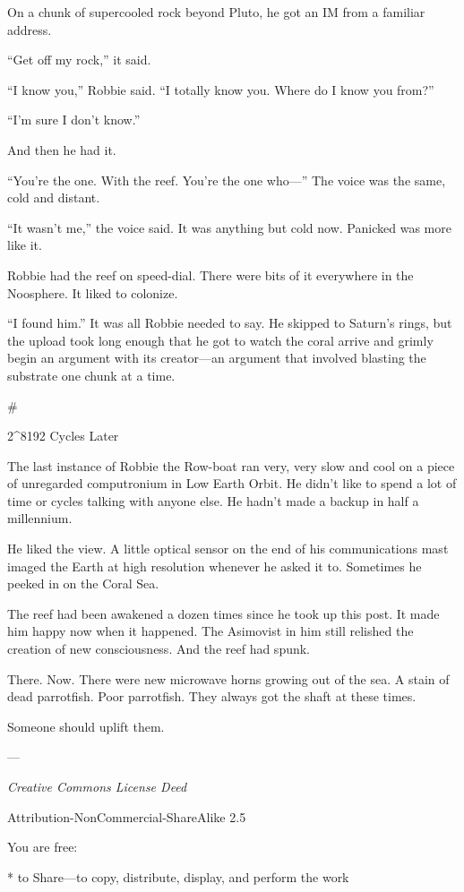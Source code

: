 On a chunk of supercooled rock beyond Pluto, he got an IM from a
familiar address.

“Get off my rock,” it said.

“I know you,” Robbie said. “I totally know you. Where do I know you
from?”

“I’m sure I don’t know.”

And then he had it.

“You’re the one. With the reef. You’re the one who—” The voice was
the same, cold and distant.

“It wasn’t me,” the voice said. It was anything but cold now.
Panicked was more like it.

Robbie had the reef on speed-dial. There were bits of it everywhere
in the Noosphere. It liked to colonize.

“I found him.” It was all Robbie needed to say. He skipped to
Saturn’s rings, but the upload took long enough that he got to
watch the coral arrive and grimly begin an argument with its
creator—an argument that involved blasting the substrate one chunk
at a time.

\#

2\^{}8192 Cycles Later

The last instance of Robbie the Row-boat ran very, very slow and
cool on a piece of unregarded computronium in Low Earth Orbit. He
didn’t like to spend a lot of time or cycles talking with anyone
else. He hadn’t made a backup in half a millennium.

He liked the view. A little optical sensor on the end of his
communications mast imaged the Earth at high resolution whenever he
asked it to. Sometimes he peeked in on the Coral Sea.

The reef had been awakened a dozen times since he took up this
post. It made him happy now when it happened. The Asimovist in him
still relished the creation of new consciousness. And the reef had
spunk.

There. Now. There were new microwave horns growing out of the sea.
A stain of dead parrotfish. Poor parrotfish. They always got the
shaft at these times.

Someone should uplift them.

—

\emph{Creative Commons License Deed}

Attribution-NonCommercial-ShareAlike 2.5

You are free:

* to Share—to copy, distribute, display, and perform the work

